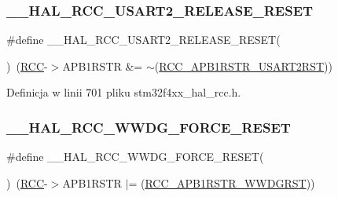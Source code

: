 \subsubsection{\texorpdfstring{\+\_\+\+\_\+\+H\+A\+L\+\_\+\+R\+C\+C\+\_\+\+U\+S\+A\+R\+T2\+\_\+\+R\+E\+L\+E\+A\+S\+E\+\_\+\+R\+E\+S\+ET}{\_\_HAL\_RCC\_USART2\_RELEASE\_RESET}}
{\footnotesize\ttfamily \#define \+\_\+\+\_\+\+H\+A\+L\+\_\+\+R\+C\+C\+\_\+\+U\+S\+A\+R\+T2\+\_\+\+R\+E\+L\+E\+A\+S\+E\+\_\+\+R\+E\+S\+ET(\begin{DoxyParamCaption}{ }\end{DoxyParamCaption})~(\hyperlink{group___peripheral__declaration_ga74944438a086975793d26ae48d5882d4}{R\+CC}-\/$>$A\+P\+B1\+R\+S\+TR \&= $\sim$(\hyperlink{group___peripheral___registers___bits___definition_ga195c39f08384ca1fa13b53a31d65d0a5}{R\+C\+C\+\_\+\+A\+P\+B1\+R\+S\+T\+R\+\_\+\+U\+S\+A\+R\+T2\+R\+ST}))}



Definicja w linii 701 pliku stm32f4xx\+\_\+hal\+\_\+rcc.\+h.

\mbox{\label{group___r_c_c___a_p_b1___force___release___reset_gaf60e74dcb0fdadafd6b4762aa81fc409}} 
\subsubsection{\texorpdfstring{\+\_\+\+\_\+\+H\+A\+L\+\_\+\+R\+C\+C\+\_\+\+W\+W\+D\+G\+\_\+\+F\+O\+R\+C\+E\+\_\+\+R\+E\+S\+ET}{\_\_HAL\_RCC\_WWDG\_FORCE\_RESET}}
{\footnotesize\ttfamily \#define \+\_\+\+\_\+\+H\+A\+L\+\_\+\+R\+C\+C\+\_\+\+W\+W\+D\+G\+\_\+\+F\+O\+R\+C\+E\+\_\+\+R\+E\+S\+ET(\begin{DoxyParamCaption}{ }\end{DoxyParamCaption})~(\hyperlink{group___peripheral__declaration_ga74944438a086975793d26ae48d5882d4}{R\+CC}-\/$>$A\+P\+B1\+R\+S\+TR $\vert$= (\hyperlink{group___peripheral___registers___bits___definition_ga0d2591ac0655a8798f4c16cef97e6f94}{R\+C\+C\+\_\+\+A\+P\+B1\+R\+S\+T\+R\+\_\+\+W\+W\+D\+G\+R\+ST}))}



